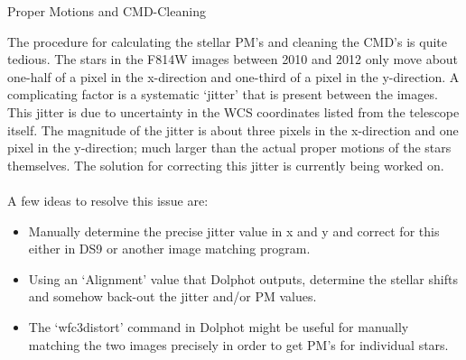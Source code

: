 \documentclass[12pt]{article}
\begin{document}
\begin{section}{Proper Motions and CMD-Cleaning}

The procedure for calculating the stellar PM's and cleaning the CMD's is quite tedious. The stars in the F814W images between 2010 and 2012 only move about one-half of a pixel in the x-direction and one-third of a pixel in the y-direction. A complicating factor is a systematic `jitter' that is present between the images. This jitter is due to uncertainty in the WCS coordinates listed from the telescope itself. The magnitude of the jitter is about three pixels in the x-direction and one pixel in the y-direction; much larger than the actual proper motions of the stars themselves. The solution for correcting this jitter is currently being worked on. \\
\\ 
A few ideas to resolve this issue are:
\begin{itemize}
\item Manually determine the precise jitter value in x and y and correct for this either in DS9 or another image matching program.
\item Using an `Alignment' value that Dolphot outputs, determine the stellar shifts and somehow back-out the jitter and/or PM values.
\item The `wfc3distort' command in Dolphot might be useful for manually matching the two images precisely in order to get PM's for individual stars.
\end{itemize}



\end{section}




 
\end{document}
